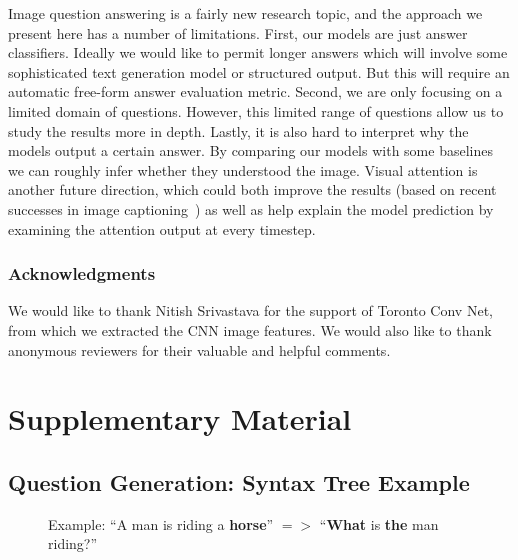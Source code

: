 \documentclass{article} \usepackage{nips15submit_e,times}
\renewcommand{\#}[1]{\textbf{#1}}
\begin{document}
Image question answering is a fairly new research topic, and the approach we
present here has a number of limitations. First, our models are just answer
classifiers. Ideally we would like to permit longer answers which will involve
some sophisticated text generation model or structured output. But this will
require an automatic free-form answer evaluation metric. Second, we are only
focusing on a limited domain of questions. However, this limited range of
questions allow us to study the results more in depth. Lastly, it is also hard
to interpret why the models output a certain answer. By comparing our models with
some baselines we can roughly infer whether they understood the image.
Visual attention is another future direction, which could both improve the
results (based on recent successes in image captioning~\cite{xu15}) as well as
help explain the model prediction by examining the attention output at every
timestep.

\subsubsection*{Acknowledgments}

We would like to thank Nitish Srivastava for the support of Toronto Conv Net,
from which we extracted the CNN image features. We would also like to thank
anonymous reviewers for their valuable and helpful comments.

\begin{small}


\end{small}
 \appendix
\section{Supplementary Material}
\subsection{Question Generation: Syntax Tree Example}
\begin{figure}[h!]
\centering
\small
\scalebox{0.8}{
\Tree [.S [.NP [.DET a ] [.N man ] ] [.VP [.V is ] [.NP [.VBG riding ] [.NP
[.DET a ] [.N horse ] ] ] ] ]} 
\vspace{5mm}
\caption{Example: ``A man is riding a \textbf{horse}'' $=>$ ``\textbf{What} is 
\textbf{the} man riding?''}
\label{fig:what_gen}
\end{figure}
\end{document}
